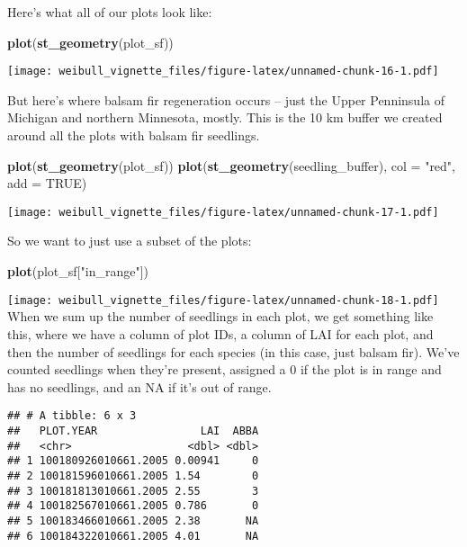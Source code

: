 \documentclass[
]{article}
\newenvironment{Shaded}{\begin{snugshade}}{\end{snugshade}}
\newcommand{\AttributeTok}[1]{\textcolor[rgb]{0.13,0.29,0.53}{#1}}
\newcommand{\ConstantTok}[1]{\textcolor[rgb]{0.56,0.35,0.01}{#1}}
\newcommand{\FunctionTok}[1]{\textcolor[rgb]{0.13,0.29,0.53}{\textbf{#1}}}
\newcommand{\NormalTok}[1]{#1}
\newcommand{\StringTok}[1]{\textcolor[rgb]{0.31,0.60,0.02}{#1}}
\begin{document}
Here's what all of our plots look like:

\begin{Shaded}
\begin{Highlighting}[]
\FunctionTok{plot}\NormalTok{(}\FunctionTok{st\_geometry}\NormalTok{(plot\_sf))}
\end{Highlighting}
\end{Shaded}

\texttt{[image: weibull\_vignette\_files/figure-latex/unnamed-chunk-16-1.pdf]}

But here's where balsam fir regeneration occurs -- just the Upper
Penninsula of Michigan and northern Minnesota, mostly. This is the 10 km
buffer we created around all the plots with balsam fir seedlings.

\begin{Shaded}
\begin{Highlighting}[]
\FunctionTok{plot}\NormalTok{(}\FunctionTok{st\_geometry}\NormalTok{(plot\_sf))}
\FunctionTok{plot}\NormalTok{(}\FunctionTok{st\_geometry}\NormalTok{(seedling\_buffer), }\AttributeTok{col =} \StringTok{"red"}\NormalTok{, }\AttributeTok{add =} \ConstantTok{TRUE}\NormalTok{)}
\end{Highlighting}
\end{Shaded}

\texttt{[image: weibull\_vignette\_files/figure-latex/unnamed-chunk-17-1.pdf]}

So we want to just use a subset of the plots:

\begin{Shaded}
\begin{Highlighting}[]
\FunctionTok{plot}\NormalTok{(plot\_sf[}\StringTok{"in\_range"}\NormalTok{])}
\end{Highlighting}
\end{Shaded}

\texttt{[image: weibull\_vignette\_files/figure-latex/unnamed-chunk-18-1.pdf]}
When we sum up the number of seedlings in each plot, we get something
like this, where we have a column of plot IDs, a column of LAI for each
plot, and then the number of seedlings for each species (in this case,
just balsam fir). We've counted seedlings when they're present, assigned
a 0 if the plot is in range and has no seedlings, and an NA if it's out
of range.

\begin{verbatim}
## # A tibble: 6 x 3
##   PLOT.YEAR                LAI  ABBA
##   <chr>                  <dbl> <dbl>
## 1 100180926010661.2005 0.00941     0
## 2 100181596010661.2005 1.54        0
## 3 100181813010661.2005 2.55        3
## 4 100182567010661.2005 0.786       0
## 5 100183466010661.2005 2.38       NA
## 6 100184322010661.2005 4.01       NA
\end{verbatim}
\end{document}
